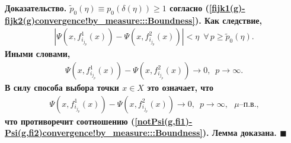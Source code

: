 \documentclass{report}
\newenvironment{Proof}{\par\noindent\bf Доказательство.\rm}{ $\blacksquare$\par}
\begin{document}
\begin{Proof}
$\tilde{p}_0(\eta)\equiv p_0(\delta(\eta))\geqslant1$ согласно (\ref{fijk1(g)-fijk2(g)convergence!by_measure:::Boundness}). Как следствие,
\begin{gather*}
|\Psi(x,f_{i_{j_p}}^1(x))-\Psi(x,f_{i_{j_p}}^2(x))|<\eta\,\,\,\forall\,p\geqslant\tilde{p}_0(\eta).
\end{gather*}
Иными словами,
\begin{gather*}
\Psi(x,f_{i_{j_p}}^1(x))-\Psi(x,f_{i_{j_p}}^2(x))\to0,\,\,\,p\to\infty.
\end{gather*}
В силу способа выбора точки $x\in X$ это означает, что
\begin{gather*}
\Psi(x,f_{i_{j_p}}^1(x))-\Psi(x,f_{i_{j_p}}^2(x))\to0,\,\,\,p\to\infty,\text{ $\mu$--п.в.,}
\end{gather*}
что противоречит соотношению (\ref{notPsi(g,fi1)-Psi(g,fi2)convergence!by_measure:::Boundness}). Лемма доказана.
\end{Proof}
\end{document}
